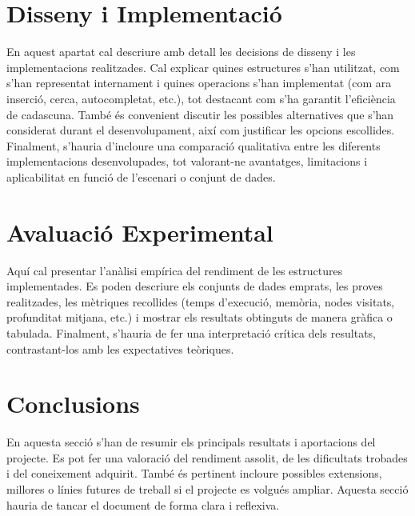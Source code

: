 \section{Disseny i Implementació}

En aquest apartat cal descriure amb detall les decisions de disseny i les implementacions realitzades. Cal explicar quines estructures s’han utilitzat, com s’han representat internament i quines operacions s’han implementat (com ara inserció, cerca, autocompletat, etc.), tot destacant com s’ha garantit l’eficiència de cadascuna. També és convenient discutir les possibles alternatives que s’han considerat durant el desenvolupament, així com justificar les opcions escollides. Finalment, s’hauria d’incloure una comparació qualitativa entre les diferents implementacions desenvolupades, tot valorant-ne avantatges, limitacions i aplicabilitat en funció de l’escenari o conjunt de dades.

\section{Avaluació Experimental}

Aquí cal presentar l’anàlisi empírica del rendiment de les estructures implementades. Es poden descriure els conjunts de dades emprats, les proves realitzades, les mètriques recollides (temps d’execució, memòria, nodes visitats, profunditat mitjana, etc.) i mostrar els resultats obtinguts de manera gràfica o tabulada. Finalment, s’hauria de fer una interpretació crítica dels resultats, contrastant-los amb les expectatives teòriques.

\section{Conclusions}

En aquesta secció s’han de resumir els principals resultats i aportacions del projecte. Es pot fer una valoració del rendiment assolit, de les dificultats trobades i del coneixement adquirit. També és pertinent incloure possibles extensions, millores o línies futures de treball si el projecte es volgués ampliar. Aquesta secció hauria de tancar el document de forma clara i reflexiva.
